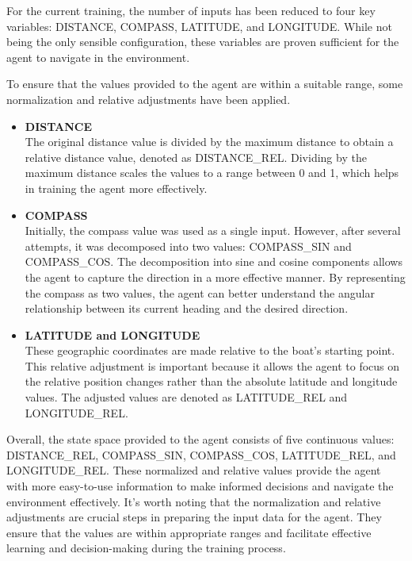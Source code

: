 \begin{textblock}
For the current training, the number of inputs has been reduced to four key variables: DISTANCE, COMPASS, LATITUDE, and LONGITUDE. While not being the only sensible configuration, these variables are proven sufficient for the agent to navigate in the environment.

To ensure that the values provided to the agent are within a suitable range, some normalization and relative adjustments have been applied.
\end{textblock}


\begin{itemize}

\item {\bf DISTANCE }\\
The original distance value is divided by the maximum distance to obtain a relative distance value, denoted as DISTANCE\_REL. Dividing by the maximum distance scales the values to a range between 0 and 1, which helps in training the agent more effectively.

\item {\bf COMPASS }\\
Initially, the compass value was used as a single input. However, after several attempts, it was decomposed into two values: COMPASS\_SIN and COMPASS\_COS. The decomposition into sine and cosine components allows the agent to capture the direction in a more effective manner. By representing the compass as two values, the agent can better understand the angular relationship between its current heading and the desired direction.

\item {\bf LATITUDE and LONGITUDE }\\
These geographic coordinates are made relative to the boat's starting point. This relative adjustment is important because it allows the agent to focus on the relative position changes rather than the absolute latitude and longitude values. The adjusted values are denoted as LATITUDE\_REL and LONGITUDE\_REL.
\end{itemize}

\begin{textblock}
Overall, the state space provided to the agent consists of five continuous values: DISTANCE\_REL, COMPASS\_SIN, COMPASS\_COS, LATITUDE\_REL, and LONGITUDE\_REL. These normalized and relative values provide the agent with more easy-to-use information to make informed decisions and navigate the environment effectively.
It's worth noting that the normalization and relative adjustments are crucial steps in preparing the input data for the agent. They ensure that the values are within appropriate ranges and facilitate effective learning and decision-making during the training process\cite{spatialdistance2020}\cite{geolocationml2021}.

\end{textblock}


\blankpage